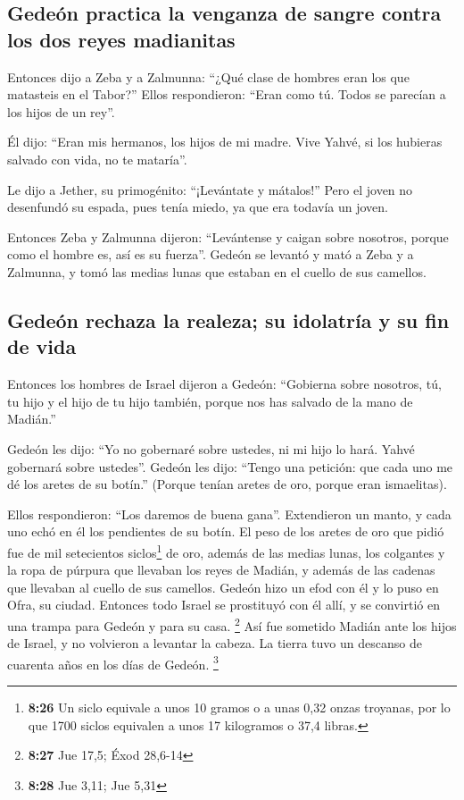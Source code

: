 \begin{paracol}{2}
\hypertarget{gedeuxf3n-practica-la-venganza-de-sangre-contra-los-dos-reyes-madianitas}{%
\subsection{Gedeón practica la venganza de sangre contra los dos reyes
madianitas}\label{gedeuxf3n-practica-la-venganza-de-sangre-contra-los-dos-reyes-madianitas}}

 Entonces dijo a Zeba y a Zalmunna: ``¿Qué clase de
hombres eran los que matasteis en el Tabor?'' Ellos respondieron: ``Eran
como tú. Todos se parecían a los hijos de un rey''.

 Él dijo: ``Eran mis hermanos, los hijos de mi madre.
Vive Yahvé, si los hubieras salvado con vida, no te mataría''.

 Le dijo a Jether, su primogénito: ``¡Levántate y
mátalos!'' Pero el joven no desenfundó su espada, pues tenía miedo, ya
que era todavía un joven.

 Entonces Zeba y Zalmunna dijeron: ``Levántense y caigan
sobre nosotros, porque como el hombre es, así es su fuerza''. Gedeón se
levantó y mató a Zeba y a Zalmunna, y tomó las medias lunas que estaban
en el cuello de sus camellos.

\hypertarget{gedeuxf3n-rechaza-la-realeza-su-idolatruxeda-y-su-fin-de-vida}{%
\subsection{Gedeón rechaza la realeza; su idolatría y su fin de
vida}\label{gedeuxf3n-rechaza-la-realeza-su-idolatruxeda-y-su-fin-de-vida}}

 Entonces los hombres de Israel dijeron a Gedeón:
``Gobierna sobre nosotros, tú, tu hijo y el hijo de tu hijo también,
porque nos has salvado de la mano de Madián.''

 Gedeón les dijo: ``Yo no gobernaré sobre ustedes, ni mi
hijo lo hará. Yahvé gobernará sobre ustedes''.  Gedeón
les dijo: ``Tengo una petición: que cada uno me dé los aretes de su
botín.'' (Porque tenían aretes de oro, porque eran ismaelitas).

 Ellos respondieron: ``Los daremos de buena gana''.
Extendieron un manto, y cada uno echó en él los pendientes de su botín.
 El peso de los aretes de oro que pidió fue de mil
setecientos siclos\footnote{\textbf{8:26} Un siclo equivale a unos 10
  gramos o a unas 0,32 onzas troyanas, por lo que 1700 siclos equivalen
  a unos 17 kilogramos o 37,4 libras.} de oro, además de las medias
lunas, los colgantes y la ropa de púrpura que llevaban los reyes de
Madián, y además de las cadenas que llevaban al cuello de sus camellos.
 Gedeón hizo un efod con él y lo puso en Ofra, su ciudad.
Entonces todo Israel se prostituyó con él allí, y se convirtió en una
trampa para Gedeón y para su casa. \footnote{\textbf{8:27} Jue 17,5;
  Éxod 28,6-14}  Así fue sometido Madián ante los hijos
de Israel, y no volvieron a levantar la cabeza. La tierra tuvo un
descanso de cuarenta años en los días de Gedeón. \footnote{\textbf{8:28}
  Jue 3,11; Jue 5,31}


\end{paracol}
